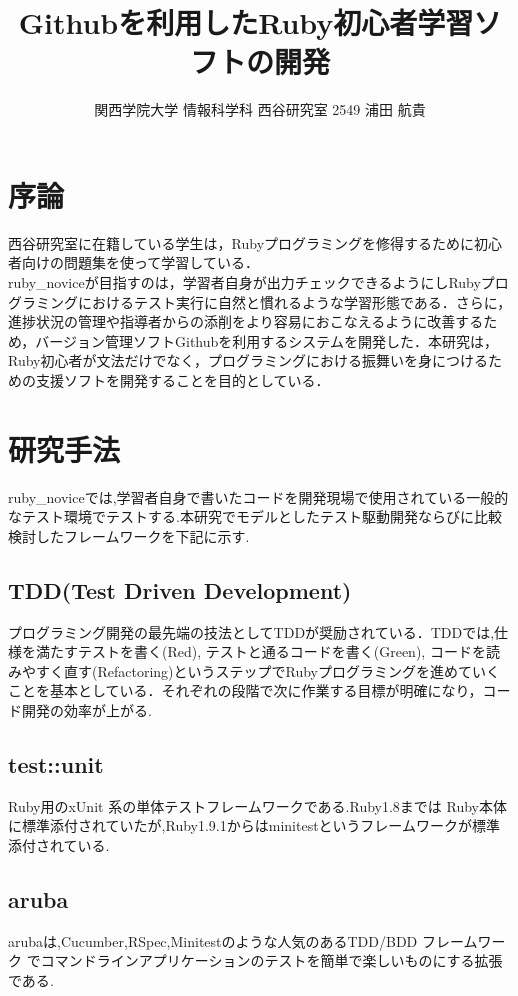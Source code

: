 \documentclass[10pt,a4j,twocolumn]{jsarticle}
\begin{document}
\title{Githubを利用したRuby初心者学習ソフトの開発}
\author{関西学院大学 情報科学科 西谷研究室 2549 浦田 航貴}
\date{}
\maketitle
\section{序論}
西谷研究室に在籍している学生は，Rubyプログラミングを修得するために初心者向けの問題集を使って学習している．\\
ruby\_noviceが目指すのは，学習者自身が出力チェックできるようにしRubyプログラミングにおけるテスト実行に自然と慣れるような学習形態である．さらに，進捗状況の管理や指導者からの添削をより容易におこなえるように改善するため，バージョン管理ソフトGithubを利用するシステムを開発した．本研究は，Ruby初心者が文法だけでなく，プログラミングにおける振舞いを身につけるための支援ソフトを開発することを目的としている．

\section{研究手法}
ruby\_noviceでは,学習者自身で書いたコードを開発現場で使用されている一般的なテスト環境でテストする.本研究でモデルとしたテスト駆動開発ならびに比較検討したフレームワークを下記に示す.
\subsection{TDD(Test Driven Development)}
プログラミング開発の最先端の技法としてTDDが奨励されている．TDDでは,仕様を満たすテストを書く(Red), テストと通るコードを書く(Green), コードを読みやすく直す(Refactoring)というステップでRubyプログラミングを進めていくことを基本としている．それぞれの段階で次に作業する目標が明確になり，コード開発の効率が上がる.
\subsection{test::unit}
Ruby用のxUnit 系の単体テストフレームワークである.Ruby1.8までは Ruby本体に標準添付されていたが,Ruby1.9.1からはminitestというフレームワークが標準添付されている\cite{1}.
\subsection{aruba}
arubaは,Cucumber,RSpec,Minitestのような人気のあるTDD/BDD フレームワーク
でコマンドラインアプリケーションのテストを簡単で楽しいものにする拡張である\cite{2}.
\end{document}
